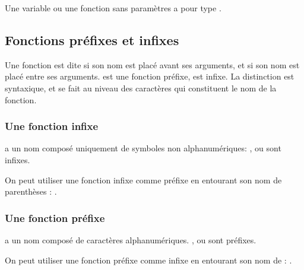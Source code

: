 Une variable ou une fonction sans paramètres a pour type .

\subsection{Fonctions préfixes et infixes}
\label{infix-functions}
\label{prefix-functions}

Une fonction est dite  si son nom est placé avant ses arguments, et  si son nom est placé entre ses arguments.  est une fonction préfixe, \hsFn{+} est infixe. La distinction est syntaxique, et se fait au niveau des caractères qui constituent le nom de la fonction.

\subsubsection[Fonctions infixes]{Une fonction infixe} a un nom composé uniquement de symboles non alphanumériques: \hsFn{+}, \hsFn{*} ou \hsFn{>>=} sont infixes.

On peut utiliser une fonction infixe comme préfixe en entourant son nom de parenthèses : .

\subsubsection[Fonctions préfixes]{Une fonction préfixe} a un nom composé
de caractères alphanumériques. ,  ou  sont préfixes.

On peut utiliser une fonction préfixe comme infixe en entourant son nom de  : .
